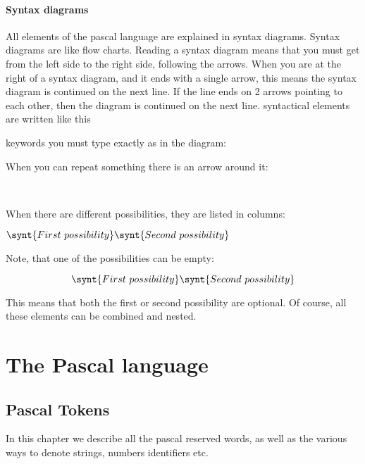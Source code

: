 \documentclass{report}
\begin{document}
\subsection{Syntax diagrams}
All elements of the pascal language are explained in syntax diagrams.
Syntax diagrams are like flow charts. Reading a syntax diagram means that
you must get from the left side to the right side, following the arrows.
When you are at the right of a syntax diagram, and it ends with a single
arrow, this means the syntax diagram is continued on the next line. If
the line ends on 2 arrows pointing to each other, then the diagram is
continued on the next line.
syntactical elements are written like this
\begin{mysyntdiag}
\end{mysyntdiag}
keywords you must type exactly as in the diagram:
\begin{mysyntdiag}
\end{mysyntdiag}
When you can repeat something there is an arrow around it:
\begin{mysyntdiag}
\<[b]  \\ \>
\end{mysyntdiag}
When there are different possibilities, they are listed in columns:
\begin{mysyntdiag}
\( 
\synt{First\ possibility} \\
\synt{Second\ possibility}
\)
\end{mysyntdiag}
Note, that one of the possibilities can be empty:
\begin{mysyntdiag}
\[ 
\synt{First\ possibility} \\
\synt{Second\ possibility}
\]
\end{mysyntdiag}
This means that both the first or second possibility are optional.
Of course, all these elements can be combined and nested.
\part{The Pascal language}
%
%
\chapter{Pascal Tokens}
In this chapter we describe all the pascal reserved words, as well as the
various ways to denote strings, numbers identifiers etc.
\end{document}
